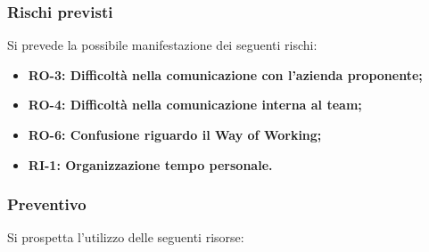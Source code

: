 \documentclass[a4paper,12pt]{article}
\newlength{\namecol}
\begin{document}
{        \subsubsection{Rischi previsti}{
            Si prevede la possibile manifestazione dei seguenti rischi:
            \begin{itemize}
                \item \textbf{RO-3: Difficoltà nella comunicazione con l'azienda proponente;}
                \item \textbf{RO-4: Difficoltà nella comunicazione interna al team;}
                \item \textbf{RO-6: Confusione riguardo il Way of Working;}
                \item \textbf{RI-1: Organizzazione tempo personale.}
            \end{itemize}
        }
     \subsubsection{Preventivo}{
            Si prospetta l'utilizzo delle seguenti risorse:

            \begin{table}[H]
                \centering

                \hspace*{-14cm}%



\end{table}}}
\end{document}
